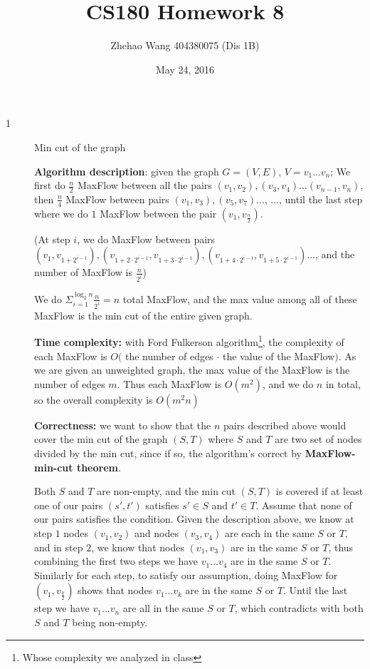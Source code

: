 \documentclass{article}
\title{CS180 Homework 8}
\author{Zhehao Wang 404380075 (Dis 1B)}
\date{May 24, 2016}
\begin{document}
\maketitle

\begin{description}

\item[1]{Min cut of the graph}
  
  \textbf{Algorithm description}: given the graph $G = (V, E)$, $V=v_1...v_n$; We first do $\frac{n}{2}$ MaxFlow between all the pairs $(v_1, v_2), (v_3, v_4)...(v_{n-1}, v_n)$, then $\frac{n}{4}$ MaxFlow between pairs $(v_1, v_3), (v_5, v_7)...$, ..., until the last step where we do $1$ MaxFlow between the pair $(v_1, v_{\frac{n}{2}})$. 

  (At step $i$, we do MaxFlow between pairs $(v_1, v_{1 + 2^{i - 1}}), (v_{1 + 2 \cdot 2^{i - 1}}, v_{1 + 3 \cdot 2^{i - 1}}), (v_{1 + 4 \cdot 2^{i - 1}}, v_{1 + 5 \cdot 2^{i - 1}})...$, and the number of MaxFlow is $\frac{n}{2^i}$)

  We do $\Sigma_{i=1}^{\log_{2}{n}}{\frac{n}{2^i}} = n$ total MaxFlow, and the max value among all of these MaxFlow is the min cut of the entire given graph.
  
  \textbf{Time complexity:} with Ford Fulkerson algorithm\footnote{Whose complexity we analyzed in class}, the complexity of each MaxFlow is $O($ the number of edges $\cdot$ the value of the MaxFlow$)$. As we are given an unweighted graph, the max value of the MaxFlow is the number of edges $m$. Thus each MaxFlow is $O(m^2)$, and we do $n$ in total, so the overall complexity is $O(m^2 n)$

  \textbf{Correctness:} we want to show that the $n$ pairs described above would cover the min cut of the graph $(S, T)$ where $S$ and $T$ are two set of nodes divided by the min cut, since if so, the algorithm's correct by \textbf{MaxFlow-min-cut theorem}.

  Both $S$ and $T$ are non-empty, and the min cut $(S, T)$ is covered if at least one of our pairs $(s', t')$ satisfies $s' \in S$ and $t' \in T$. Assume that none of our pairs satisfies the condition. Given the description above, we know at step $1$ nodes $(v_1, v_2)$ and nodes $(v_3, v_4)$ are each in the same $S$ or $T$, and in step $2$, we know that nodes $(v_1, v_3)$ are in the same $S$ or $T$, thus combining the first two steps we have $v_1...v_4$ are in the same $S$ or $T$. Similarly for each step, to satisfy our assumption, doing MaxFlow for $(v_1, v_{\frac{k}{2}})$ shows that nodes $v_1...v_k$ are in the same $S$ or $T$. Until the last step we have $v_1...v_n$ are all in the same $S$ or $T$, which contradicts with both $S$ and $T$ being non-empty. 


\end{description}
\end{document}
